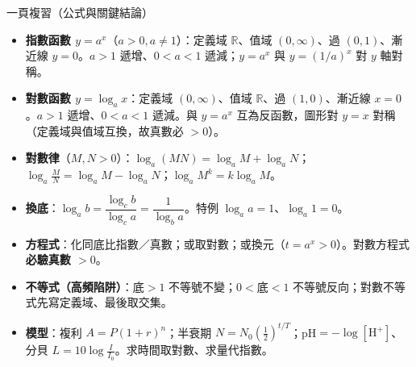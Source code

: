 \documentclass[11pt]{article}
\begin{document}
\begin{補充框}{一頁複習（公式與關鍵結論）}
\begin{itemize}\setlength{\itemsep}{2pt}
\item \textbf{指數函數 $y=a^x$}（$a>0,a\ne1$）：定義域 $\mathbb{R}$、值域 $(0,\infty)$、過 $(0,1)$、漸近線 $y=0$。$a>1$ 遞增、$0<a<1$ 遞減；$y=a^x$ 與 $y=(1/a)^x$ 對 $y$ 軸對稱。
\item \textbf{對數函數 $y=\log_a x$}：定義域 $(0,\infty)$、值域 $\mathbb{R}$、過 $(1,0)$、漸近線 $x=0$。$a>1$ 遞增、$0<a<1$ 遞減。與 $y=a^x$ 互為反函數，圖形對 $y=x$ 對稱（定義域與值域互換，故真數必 $>0$）。
\item \textbf{對數律}（$M,N>0$）：$\log_a(MN)=\log_a M+\log_a N$；$\log_a\tfrac{M}{N}=\log_a M-\log_a N$；$\log_a M^{k}=k\log_a M$。
\item \textbf{換底}：$\log_a b=\dfrac{\log_c b}{\log_c a}=\dfrac{1}{\log_b a}$。特例 $\log_a a=1$、$\log_a 1=0$。
\item \textbf{方程式}：化同底比指數／真數；或取對數；或換元（$t=a^x>0$）。對數方程式\textbf{必驗真數 $>0$}。
\item \textbf{不等式（高頻陷阱）}：$\boxed{\text{底}>1\text{ 不等號不變；}0<\text{底}<1\text{ 不等號反向}}$；對數不等式先寫定義域、最後取交集。
\item \textbf{模型}：複利 $A=P(1+r)^n$；半衰期 $N=N_0(\tfrac12)^{t/T}$；pH$=-\log[\mathrm{H}^+]$、分貝 $L=10\log\tfrac{I}{I_0}$。求時間取對數、求量代指數。
\end{itemize}
\end{補充框}
\end{document}
